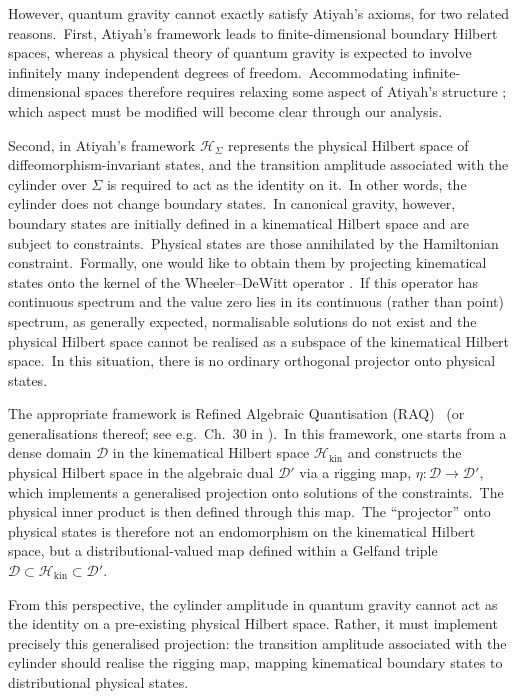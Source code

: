 \documentclass[11pt]{article}
\newcommand{\Hil}{\mathcal{H}}
\theoremstyle{definition}
\numberwithin{equation}{section}
\begin{document}
However, quantum gravity cannot exactly satisfy Atiyah's axioms, for two related reasons.~First, Atiyah's framework leads to finite-dimensional boundary Hilbert spaces, whereas a physical theory of quantum gravity is expected to involve infinitely many independent degrees of freedom.~Accommodating infinite-dimensional spaces therefore requires relaxing some aspect of Atiyah's structure \cite{Rovelli_1993,Crane_1994,Barrett_1995}; which aspect must be modified will become clear through our analysis. 


Second, in Atiyah’s framework $\Hil_\Sigma$ represents the physical Hilbert space of diffeomorphism-invariant states, and the transition amplitude associated with the cylinder over $\Sigma$ is required to act as the identity on it.~In other words, the cylinder does not change boundary states.~In canonical gravity, however, boundary states are initially defined in a kinematical Hilbert space and are subject to constraints.~Physical states are those annihilated by the Hamiltonian constraint.~Formally, one would like to obtain them by projecting kinematical states onto the kernel of the Wheeler–DeWitt operator \cite{DeWitt_67}.~If this operator has continuous spectrum and the value zero lies in its continuous (rather than point) spectrum, as generally expected, normalisable solutions do not exist and the physical Hilbert space cannot be realised as a subspace of the kinematical Hilbert space.~In this situation, there is no ordinary orthogonal projector onto physical states.

The appropriate framework is Refined Algebraic Quantisation (RAQ)~\cite{Giulini_Marolf_1999a,Giulini_Marolf_1999b} (or generalisations thereof; see e.g.~Ch.~30 in \cite{Thiemann_2007}).~In this framework, one starts from a dense domain $\mathcal D$ in the kinematical Hilbert space $\Hil_{\text{kin}}$ and constructs the physical Hilbert space in the algebraic dual $\mathcal D'$ via a rigging map, $\eta : \mathcal D \to \mathcal D'$, which implements a generalised projection onto solutions of the constraints.~The physical inner product is then defined through this map.~The ``projector'' onto physical states is therefore not an endomorphism on the kinematical Hilbert space, but a distributional-valued map defined within a Gelfand triple $\mathcal D \subset \Hil_{\text{kin}} \subset \mathcal D'$.

From this perspective, the cylinder amplitude in quantum gravity cannot act as the identity on a pre-existing physical Hilbert space. Rather, it must implement precisely this generalised projection: the transition amplitude associated with the cylinder should realise the rigging map, mapping kinematical boundary states to distributional physical states. 
\end{document}
